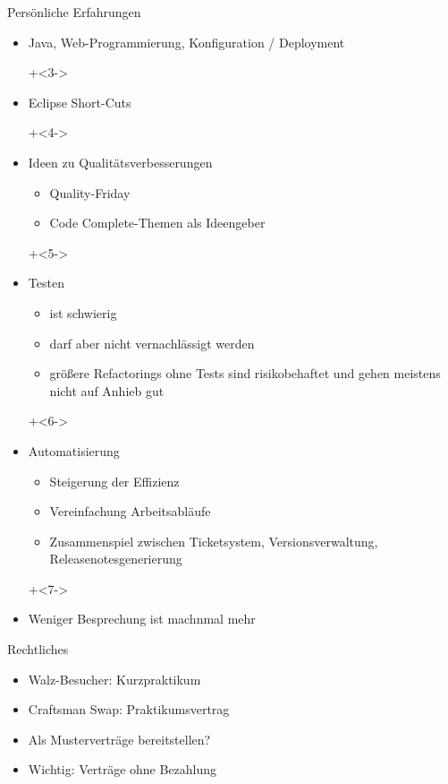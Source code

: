 \begin{frame}{Persönliche Erfahrungen}

\begin{itemize}
\onslide+<2->
\item Java, Web-Programmierung, Konfiguration / Deployment

\onslide+<3->
\item Eclipse Short-Cuts

\onslide+<4->
\item Ideen zu Qualitätsverbesserungen
\begin{itemize}
\item Quality-Friday
\item \glqq Code Complete\grqq{}-Themen als Ideengeber
\end{itemize}

\onslide+<5->
\item Testen
\begin{itemize}
\item  ist schwierig
\item darf aber nicht vernachlässigt werden
\item größere Refactorings ohne Tests sind risikobehaftet und gehen meistens nicht auf Anhieb gut
\end{itemize}

\onslide+<6->
\item Automatisierung
\begin{itemize}
\item Steigerung der Effizienz
\item Vereinfachung Arbeitsabläufe
\item Zusammenspiel zwischen Ticketsystem, Versionsverwaltung, Releasenotesgenerierung
\end{itemize}

\onslide+<7->
\item Weniger Besprechung ist machnmal mehr


\end{itemize}

\end{frame}


\begin{frame}{Rechtliches}

\begin{itemize}
\item Walz-Besucher: Kurzpraktikum

\item Craftsman Swap: Praktikumsvertrag

\item Als Musterverträge bereitstellen?

\item Wichtig: Verträge ohne Bezahlung

\end{itemize}

\end{frame}


